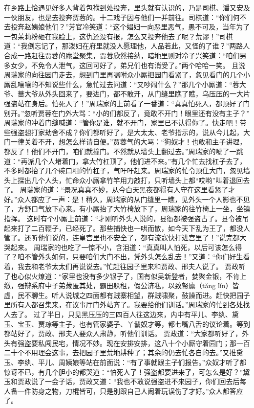 \documentclass[12pt,oneside]{book}
\begin{document}
在乡路上恰遇见好多人背着包袱到处投奔，里头就有认识的，乃是司棋、潘又安及一伙朋友，也是去投奔贾蓉的。十二戏子因与他们一并前往。司棋道：“你们何不去投奔赵姨娘他们？”芳官冷笑道：“这个娼妇一向恶里恶气，愚不可及，当年为了一包茉莉粉砸在我脸上，这仇还没有报，怎么又投奔他去了呢？荒谬！”司棋道：“我倒忘记了，那泼妇在府里就没人愿理他，人品若此，又怪的了谁？”两路人合成一路赶往贾蓉的庵堂聚集，贾蓉欣然接纳，暗地里则对冷子兴笑道：“咱们男多女少，不免令人泄气，这回可好了，弟兄们也有消受了。”两个哈哈一笑。
且说周瑞家的向往园门走去，想到门里再嘱咐众小厮把园门看紧了，忽见看门的几个小厮乱嚷嚷的不知说些什么，急忙过去问道：“又吵闹什么？”那几个小厮道：“蓉大爷、蔷大爷从外头回来了，要进门，都不敢开，从门缝里瞧了瞧，乌压压的一大片强盗站在身后。怕死人了！”周瑞家的上前看了一番道：“真真怕死人，都顶好了门别开。”忽听贾蓉在门外大骂：“小的们都反了，竟敢不开门！眼里还有没有主子？”
周瑞家的冲着门缝喊道：“管你是谁，就不开门，家里已不认得你了。快走吧！带些强盗想打家劫舍不成？你们都听好了，是大太太、老爷指示的，说从今儿起，大门一律关着不开，想怎么样请自便。”贾蓉气的大骂：“狗奴才！也敢和主子讲理，都反了！他们不开门，咱们就撞门。不然就从墙头上翻过去。”周瑞家的唬了一跳道：“再派几个人堵着门，拿大竹杠顶了，他们进不来。”有几个忙去找杠子去了，不多时都抬了几个碗口粗的竹杠子，气吁吁赶来。周瑞家的忙令顶住大门，忽见墙头上探出几个人头，忙命众小厮拿竹竿用力敲打，只听墙头上都“哎哟”叫着退回去了。
周瑞家的道：“景况真真不妙，从今白天黑夜都得有人守在这里看紧了才好。”众人都应了一声：是！稍久，周瑞家的从门缝里一瞧，见外头一个人影也不见了，方舒口气放下心来。有小厮抬了大竹椅放下了，周瑞家的往竹椅上一坐，坐镇指挥。
这时有个小厮上前道：“才刚听外头人说的，县衙都被强盗占了。县令被吊起来打了二百鞭子，已经死了。那些捕快也一哄而散，如今天下乱为王了，都没人管了。还听他们说的，连皇宫里也不安全了，都有流寇快打进宫里了！”说完都大哭起来。
周瑞家的也吃了一惊不小，含泪道：“真真叫人怕死，以后可该怎么得了？咱不管外头如何，只要咱们大门不出，凭外头怎么乱去！”又道：“你们好生看着，我去和老爷太太们再说说去。”忙赶往园子里来和贾政、邢夫人说了。
贾政听了也心似火燎道：“家里也没有多少银子了，国有似吴新登者，婪聚金银，不肯上缴，强辩系府中子弟藏匿其处，霸田躲租，假公济私，以致帑廪（tǎng lǐn）皆虚，民不聊生。听人说城之四面都有贼寨相望，群贼啸聚，鼓譟而进。赶快把园子里所有人都召集来，在议事厅门外站齐了。我要给他们训话。”周瑞家的忙到各处找人去了。
过了半日，只见黑压压的三四百人往这边来，内中有平儿、李纨、黛玉、宝玉、贾琮等主子，也有管家婆子、丫鬟奴才等，都七嘴八舌的议论着。等到都站好了，贾政、邢夫人要众人肃静，听他们训话。
贾政道：“大家都听好了，外头有强盗要私闯民宅，情况不妙。现在安排安排，这八十个小厮守着园门；那一百二十个不用理会这事，去把园子里荒地耕种了；其余的仍去忙各自的去。”又推黛玉、李纨、平儿、周姨娘等站在前面说：“有了事就跟主子们报告。”众奴才听了都惊讶不已，有几个胆小的都哭道：“怕死人了！强盗都要进来了，可怎么是好？”黛玉和贾政说了一会子话，贾政又道：“我也不敢说强盗进不来园子，你们回去后每人备一件防身之物，刀棍皆可，只是别跟自己人闹着玩误伤了才好。”众人都答应了。
\end{document}

